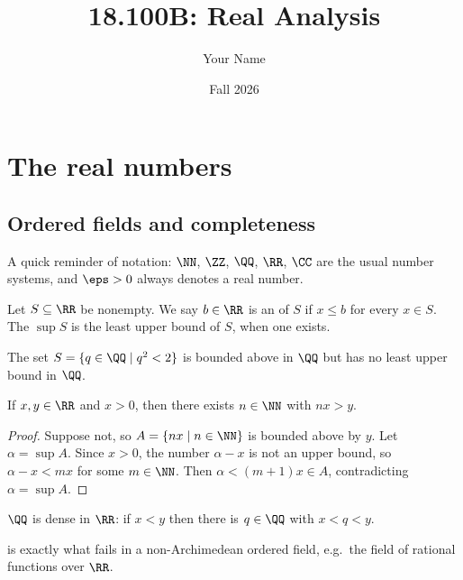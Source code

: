 \documentclass[11pt]{article}
\title{18.100B: Real Analysis}
\author{Your Name}
\date{Fall 2026}
\begin{document}
\maketitle
\tableofcontents
\newpage

\section{The real numbers}

\subsection{Ordered fields and completeness}

A quick reminder of notation: $\NN$, $\ZZ$, $\QQ$, $\RR$, $\CC$ are the usual
number systems, and $\eps > 0$ always denotes a real number.

\begin{definition}
  Let $S \subseteq \RR$ be nonempty. We say $b \in \RR$ is an
   of $S$ if $x \le b$ for every $x \in S$.
  The  $\sup S$ is the least upper bound of $S$,
  when one exists.
\end{definition}

\begin{example}
  The set $S = \{ q \in \QQ \mid q^2 < 2 \}$ is bounded above in $\QQ$
  but has no least upper bound in $\QQ$.
\end{example}

\begin{theorem}
  \label{thm:archimedean}
  If $x, y \in \RR$ and $x > 0$, then there exists $n \in \NN$ with $nx > y$.
\end{theorem}

\begin{proof}
  Suppose not, so $A = \{ nx \mid n \in \NN \}$ is bounded above by $y$.
  Let $\alpha = \sup A$. Since $x > 0$, the number $\alpha - x$ is not an
  upper bound, so $\alpha - x < mx$ for some $m \in \NN$. Then
  $\alpha < (m+1)x \in A$, contradicting $\alpha = \sup A$.
\end{proof}

\begin{corollary}
  $\QQ$ is dense in $\RR$: if $x < y$ then there is $q \in \QQ$ with
  $x < q < y$.
\end{corollary}

\begin{remark}
   is exactly what fails in a non-Archimedean
  ordered field, e.g.\ the field of rational functions over $\RR$.
\end{remark}
\end{document}
